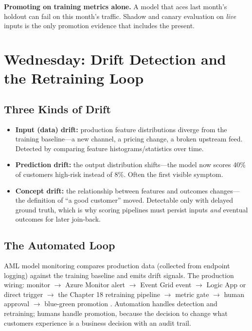 \begin{pitfall}
\textbf{Promoting on training metrics alone.} A model that aces last month's holdout can fail on this month's traffic. Shadow and canary evaluation on \emph{live} inputs is the only promotion evidence that includes the present.
\end{pitfall}

\section{Wednesday: Drift Detection and the Retraining Loop}

\subsection{Three Kinds of Drift}
\begin{itemize}
    \item \textbf{Input (data) drift:} production feature distributions diverge from the training baseline---a new channel, a pricing change, a broken upstream feed. Detected by comparing feature histograms/statistics over time.
    \item \textbf{Prediction drift:} the output distribution shifts---the model now scores 40\% of customers high-risk instead of 8\%. Often the first visible symptom.
    \item \textbf{Concept drift:} the relationship between features and outcomes changes---the definition of ``a good customer'' moved. Detectable only with delayed ground truth, which is why scoring pipelines must persist inputs \emph{and} eventual outcomes for later join-back.
\end{itemize}

\subsection{The Automated Loop}
AML model monitoring compares production data (collected from endpoint logging) against the training baseline and emits drift signals. The production wiring: monitor $\rightarrow$ Azure Monitor alert $\rightarrow$ Event Grid event $\rightarrow$ Logic App or direct trigger $\rightarrow$ the Chapter 18 retraining pipeline $\rightarrow$ metric gate $\rightarrow$ human approval $\rightarrow$ blue-green promotion \cite{microsoft2025azureml}. Automation handles detection and retraining; humans handle promotion, because the decision to change what customers experience is a business decision with an audit trail.

